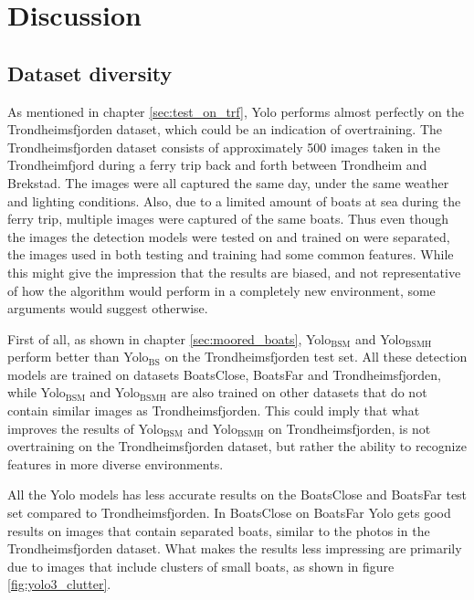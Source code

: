 \chapter{Discussion}

\section{Dataset diversity}
\label{dataset_divers}
As mentioned in chapter \ref{sec:test_on_trf}, Yolo performs almost perfectly on the Trondheimsfjorden dataset, which could be an indication of overtraining. The Trondheimsfjorden dataset consists of approximately 500 images taken in the Trondheimfjord during a ferry trip back and forth between Trondheim and Brekstad. The images were all captured the same day, under the same weather and lighting conditions. Also, due to a limited amount of boats at sea during the ferry trip, multiple images were captured of the same boats. Thus even though the images the detection models were tested on and trained on were separated, the images used in both testing and training had some common features. While this might give the impression that the results are biased, and not representative of how the algorithm would perform in a completely new environment, some arguments would suggest otherwise.

\vspace{3mm}

\noindent
First of all, as shown in chapter \ref{sec:moored_boats}, Yolo$_{\text{BSM}}$ and Yolo$_{\text{BSMH}}$ perform better than Yolo$_{\text{BS}}$ on the Trondheimsfjorden test set. All these detection models are trained on datasets BoatsClose, BoatsFar and Trondheimsfjorden, while Yolo$_{\text{BSM}}$ and Yolo$_{\text{BSMH}}$ are also trained on other datasets that do not contain similar images as Trondheimsfjorden. This could imply that what improves the results of Yolo$_{\text{BSM}}$ and Yolo$_{\text{BSMH}}$ on Trondheimsfjorden, is not overtraining on the Trondheimsfjorden dataset, but rather the ability to recognize features in more diverse environments. 

\vspace{3mm}
\noindent
All the Yolo models has less accurate results on the BoatsClose and BoatsFar test set compared to Trondheimsfjorden. In BoatsClose on BoatsFar Yolo gets good results on images that contain separated boats, similar to the photos in the Trondheimsfjorden dataset. What makes the results less impressing are primarily due to images that include clusters of small boats, as shown in figure \ref{fig:yolo3_clutter}. 

